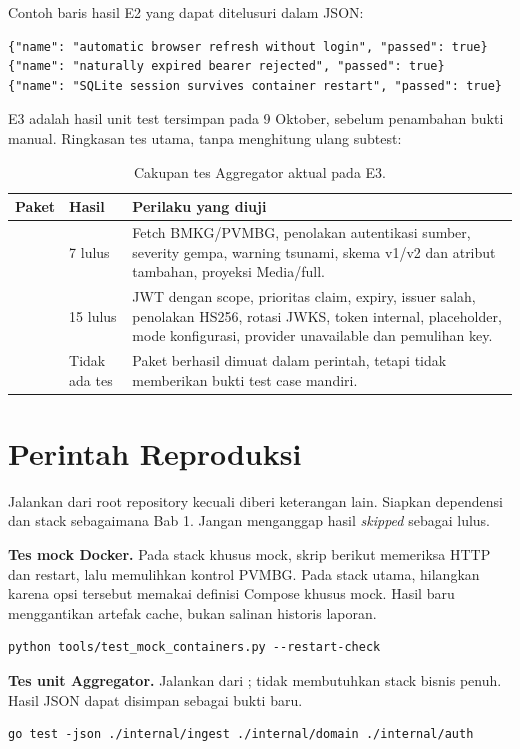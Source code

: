Contoh baris hasil E2 yang dapat ditelusuri dalam JSON:
\begin{lstlisting}
{"name": "automatic browser refresh without login", "passed": true}
{"name": "naturally expired bearer rejected", "passed": true}
{"name": "SQLite session survives container restart", "passed": true}
\end{lstlisting}

E3 adalah hasil unit test tersimpan pada 9 Oktober, sebelum penambahan bukti manual. Ringkasan tes utama, tanpa menghitung ulang subtest:
\begin{table}[H]\small
\begin{tabularx}{\textwidth}{@{}P{2cm}P{1.8cm}Y@{}}
\toprule \textbf{Paket} & \textbf{Hasil} & \textbf{Perilaku yang diuji}\\\midrule
{} & 7 lulus & Fetch BMKG/PVMBG, penolakan autentikasi sumber, severity gempa, warning tsunami, skema v1/v2 dan atribut tambahan, proyeksi Media/full.\\
 & 15 lulus & JWT dengan scope, prioritas claim, expiry, issuer salah, penolakan HS256, rotasi JWKS, token internal, placeholder, mode konfigurasi, provider unavailable dan pemulihan key.\\
 & Tidak ada tes & Paket berhasil dimuat dalam perintah, tetapi tidak memberikan bukti test case mandiri.\\\bottomrule
\end{tabularx}
\caption{Cakupan tes Aggregator aktual pada E3.}
\end{table}

\section{Perintah Reproduksi}
Jalankan dari root repository kecuali diberi keterangan lain. Siapkan dependensi dan stack sebagaimana Bab 1. Jangan menganggap hasil \emph{skipped} sebagai lulus.

\textbf{Tes mock Docker.} Pada stack khusus mock, skrip berikut memeriksa HTTP dan restart, lalu memulihkan kontrol PVMBG. Pada stack utama, hilangkan  karena opsi tersebut memakai definisi Compose khusus mock. Hasil baru menggantikan artefak cache, bukan salinan historis laporan.
\begin{lstlisting}
python tools/test_mock_containers.py --restart-check
\end{lstlisting}

\textbf{Tes unit Aggregator.} Jalankan dari ; tidak membutuhkan stack bisnis penuh. Hasil JSON dapat disimpan sebagai bukti baru.
\begin{lstlisting}
go test -json ./internal/ingest ./internal/domain ./internal/auth
\end{lstlisting}

